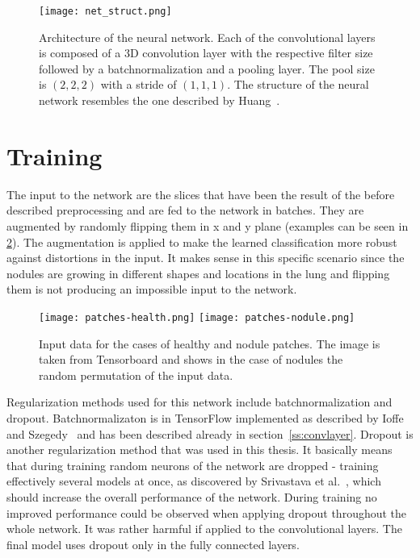 \documentclass[main.tex]{subfiles}
\begin{document}
\begin{figure}
\begin{center}
\texttt{[image: net\_struct.png]}
\end{center}
\caption{Architecture of the neural network. Each of the convolutional layers is composed of a 3D convolution layer with the respective filter size followed by a batchnormalization and a pooling layer. The pool size is $(2,2,2)$ with a stride of $(1,1,1)$. The structure of the neural network resembles the one described by Huang~\cite{huang2017lung}.}
\label{fig:net_struct}
\end{figure}


\section{Training}
The input to the network are the slices that have been the result of the before described preprocessing and are fed to the network in batches. They are augmented by randomly flipping them in x and y plane (examples can be seen in \ref{fig:input}). The augmentation is applied to make the learned classification more robust against distortions in the input. It makes sense in this specific scenario since the nodules are growing in different shapes and locations in the lung and flipping them is not producing an impossible input to the network.

\begin{figure}
\begin{center}
\texttt{[image: patches-health.png]}
\texttt{[image: patches-nodule.png]}
\end{center}
\caption{Input data for the cases of healthy and nodule patches. The image is taken from Tensorboard and shows in the case of nodules the random permutation of the input data.}
\label{fig:input}
\end{figure}

Regularization methods used for this network include batchnormalization and dropout. Batchnormalizaton is in TensorFlow implemented as described by Ioffe and Szegedy~\cite{ioffe2015batch} and has been described already in section~\ref{ss:convlayer}. Dropout is another regularization method that was used in this thesis. It basically means that during training random neurons of the network are dropped - training effectively several models at once, as discovered by Srivastava et al.~\cite{srivastava2014dropout}, which should increase the overall performance of the network. During training no improved performance could be observed when applying dropout throughout the whole network. It was rather harmful if applied to the convolutional layers. The final model uses dropout only in the fully connected  layers.
\end{document}

